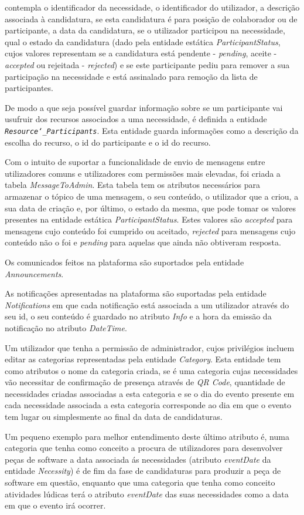 contempla o identificador da necessidade, o identificador do utilizador, a descrição associada à candidatura, 
se esta candidatura é para posição de colaborador ou de participante, a data da candidatura, se o utilizador participou na necessidade, qual o estado da candidatura (dado pela entidade estática \textit{ParticipantStatus}, cujos valores representam se a candidatura está pendente - \textit{pending}, aceite - \textit{accepted} ou rejeitada - \textit{rejected}) e se este participante pediu para remover a sua participação na necessidade e está assinalado para remoção da lista de participantes. 
\par
De modo a que seja possível guardar informação sobre se um participante vai usufruir dos recursos associados a uma necessidade, é definida a entidade \texttt{\textit{Resource\char`_Participants}}.
Esta entidade guarda informações como a descrição da escolha do recurso, o id do participante e o id do recurso.
\par
Com o intuito de suportar a funcionalidade de envio de mensagens entre utilizadores comuns e utilizadores com permissões mais elevadas, foi criada a tabela \textit{MessageToAdmin}. 
Esta tabela tem os atributos necessários para armazenar o tópico de uma mensagem, o seu conteúdo, o utilizador que a criou, a sua data de criação e, por último, o estado da mesma, que pode tomar os valores presentes na entidade estática \textit{ParticipantStatus}. 
Estes valores são \textit{accepted} para mensagens cujo conteúdo foi cumprido ou aceitado, \textit{rejected} para mensagens cujo conteúdo não o foi e \textit{pending} para aquelas que ainda não obtiveram resposta.
\par
Os comunicados feitos na plataforma são suportados pela entidade \textit{Announcements}. 
\par
As notificações apresentadas na plataforma são suportadas pela entidade \textit{Notifications} em que cada notificação está associada a um utilizador através do seu id, o seu conteúdo é guardado no atributo \textit{Info} e a hora da emissão da notificação no atributo \textit{DateTime}. 
\par
Um utilizador que tenha a permissão de administrador, cujos privilégios incluem editar as categorias representadas pela entidade \textit{Category}. Esta entidade tem como atributos o nome da categoria criada, se é uma categoria cujas necessidades vão necessitar de confirmação de presença através de \textit{QR Code}, quantidade de necessidades criadas associadas a esta categoria e se o dia do evento presente em cada necessidade associada a esta categoria corresponde ao dia em que o evento tem lugar ou simplesmente ao final da data de candidaturas. 
\par
Um pequeno exemplo para melhor entendimento deste último atributo é, numa categoria que tenha como conceito a procura de utilizadores para desenvolver peças de software a data associada ás necessidades (atributo \textit{eventDate} da entidade \textit{Necessity}) é de fim da fase de candidaturas para produzir a peça de software em questão, enquanto que uma categoria que tenha como conceito atividades lúdicas terá o atributo \textit{eventDate} das suas necessidades como a data em que o evento irá ocorrer.

